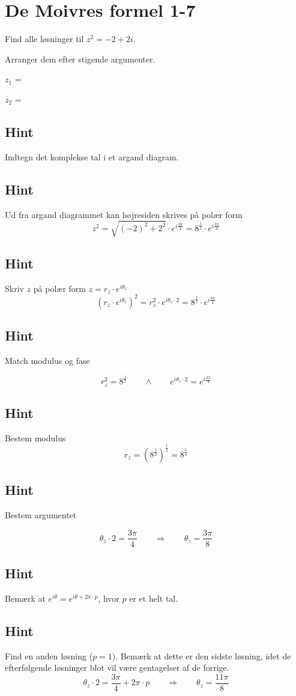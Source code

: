 \documentclass{article}
\newenvironment{exercise}[1]{\newpage\section{#1}}{}
\newcommand{\answerbox}[1]{\fbox{$#1$}}
\newcommand{\hint}{\subsection*{Hint}}
\begin{document}
\newpage

\begin{exercise}{De Moivres formel 1-7}

Find alle løsninger til $z^2=-2+2i$. 

Arranger dem efter stigende argumenter.

$z_1$ = \answerbox{8^{\frac{1}{4}} \cdot e^{i \frac{3\pi}{8}}}		

$z_2$ = \answerbox{8^{\frac{1}{4}} \cdot e^{i \frac{11\pi}{8}}}	

\hint 

Indtegn det komplekse tal i et argand diagram. 

\hint 

Ud fra argand diagrammet kan højresiden skrives på polær form
\[
z^2 = \sqrt{(-2)^2+2^2} \cdot e^{i \frac{3 \pi}{4}} = 8^{\frac{1}{2}} \cdot e^{i \frac{3 \pi}{4}} 
\]


\hint

Skriv $z$ på polær form $z = r_z \cdot e^{i \theta_z}$
\[
\left(r_z \cdot e^{i \theta_z}\right)^2 = r_z^2 \cdot e^{i \theta_z \cdot 2} = 8^{\frac{1}{2}} \cdot e^{i \frac{3 \pi}{4}} 
\]

\hint 
Match modulus og fase

\[
r_z^2 = 8^{\frac{1}{2}}  \qquad \wedge \qquad e^{i \theta_z \cdot 2} = e^{i \frac{3 \pi}{4}} 
\]

\hint

Bestem modulus
\[
r_z  =  \left(8^{\frac{1}{2}} \right)^{\frac{1}{2}} = 8^{\frac{1}{4}}
\]

\hint

Bestem argumentet

\[
\theta_z \cdot 2 = \frac{3 \pi}{4} \qquad \Rightarrow \qquad  \theta_z = \frac{3\pi}{8}
\]

\hint

Bemærk at $e^{i \theta} = e^{i \theta + 2 \pi \cdot p}$, hvor $p$ er et helt tal.

\hint

Find en anden løsning ($p=1$). 
Bemærk at dette er den sidste løsning, idet de efterfølgende 
løsninger blot vil være gentagelser af de forrige. 
\[
\theta_z \cdot 2 = \frac{3 \pi}{4}  + 2 \pi \cdot p \qquad \Rightarrow \qquad  \theta_z = \frac{11 \pi}{8}
\]


\end{exercise}

\newpage
\end{document}
